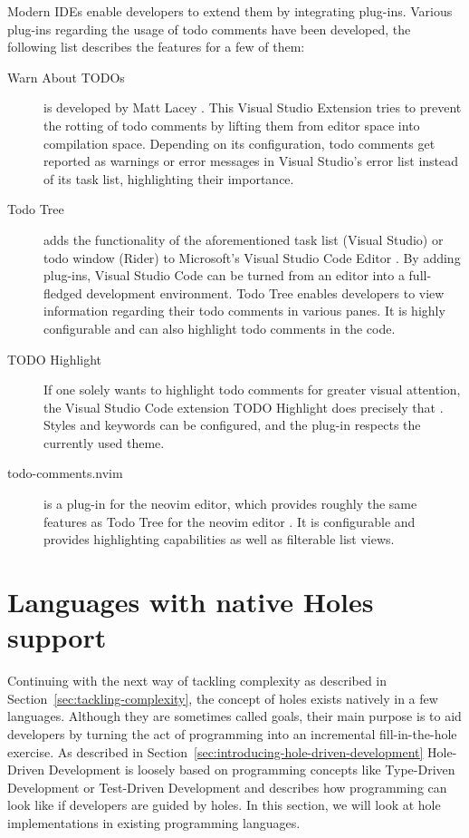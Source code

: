 Modern IDEs enable developers to extend them by integrating plug-ins.
Various plug-ins regarding the usage of todo comments have been developed, the following list describes the features for a few of them:
\begin{description}
  \item[Warn About TODOs] is developed by Matt Lacey \cite{lacey_warn_2023}. This Visual Studio Extension tries to prevent the rotting of todo comments by lifting them from editor space into compilation space. Depending on its configuration, todo comments get reported as warnings or error messages in Visual Studio's error list instead of its task list, highlighting their importance.
  \item[Todo Tree] adds the functionality of the aforementioned task list (Visual Studio) or todo window (Rider) to Microsoft's Visual Studio Code Editor \cite{scott_todo_2023}. By adding plug-ins, Visual Studio Code can be turned from an editor into a full-fledged development environment. Todo Tree enables developers to view information regarding their todo comments in various panes. It is highly configurable and can also highlight todo comments in the code.
  \item[TODO Highlight] If one solely wants to highlight todo comments for greater visual attention, the Visual Studio Code extension TODO Highlight does precisely that \cite{wayou_vscode_2023}. Styles and keywords can be configured, and the plug-in respects the currently used theme.
  \item[todo-comments.nvim] is a plug-in for the neovim editor, which provides roughly the same features as Todo Tree for the neovim editor \cite{lemaitre_todo_2023}. It is configurable and provides highlighting capabilities as well as filterable list views.
\end{description}


\section{Languages with native Holes support}
\label{sec:languages-with-native-holes-support}
Continuing with the next way of tackling complexity as described in Section~\ref{sec:tackling-complexity}, the concept of holes exists natively in a few languages.
Although they are sometimes called goals, their main purpose is to aid developers by turning the act of programming into an incremental fill-in-the-hole exercise.
As described in Section~\ref{sec:introducing-hole-driven-development} Hole-Driven Development is loosely based on programming concepts like Type-Driven Development \cite{brady_type-driven_2017} or Test-Driven Development \cite{mccracken_digital_1957} and describes how programming can look like if developers are guided by holes.
In this section, we will look at hole implementations in existing programming languages.

